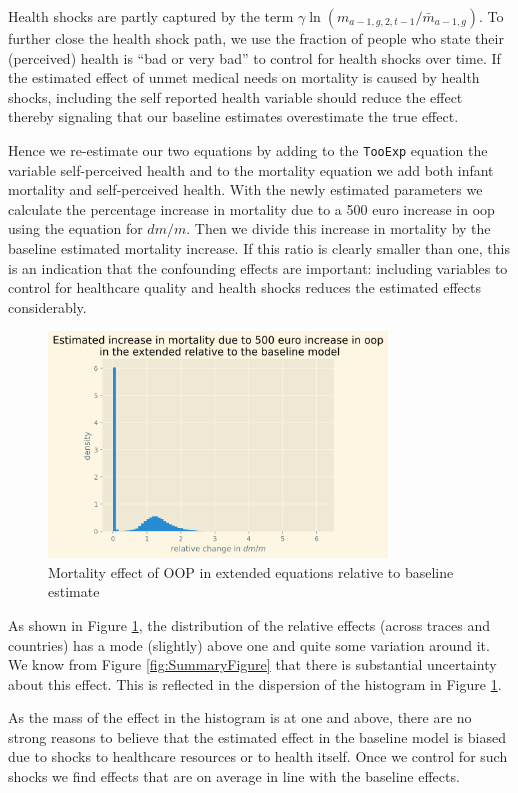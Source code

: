 \documentclass[a4paper,12pt]{article}
\begin{document}
Health shocks are partly captured by the term \(\gamma \ln(m_{a-1,g,2,t-1}/\bar m_{a-1,g})\). To further close the health shock path, we use the fraction of people who state their (perceived) health is ``bad or very bad'' to control for health shocks over time. If the estimated effect of unmet medical needs on mortality is caused by health shocks, including the self reported health variable should reduce the effect thereby signaling that our baseline estimates overestimate the true effect.

Hence we re-estimate our two equations by adding to the \texttt{TooExp} equation the variable self-perceived health and to the mortality equation we add both infant mortality and self-perceived health. With the newly estimated parameters we calculate the percentage increase in mortality due to a 500 euro increase in oop using the equation for \(dm/m\). Then we divide this increase in mortality by the baseline estimated mortality increase. If this ratio is clearly smaller than one, this is an indication that the confounding effects are important: including variables to control for healthcare quality and health shocks reduces the estimated effects considerably.

\begin{figure}[htbp]
\centering
\includegraphics[height=6cm]{./figures/histogram_colliders.png}
\caption{\label{fig:hist_colliders}Mortality effect of OOP in extended equations relative to baseline estimate}
\end{figure}

As shown in Figure \ref{fig:hist_colliders}, the distribution of the relative effects (across traces and countries) has a mode (slightly) above one and quite some variation around it. We know from Figure \ref{fig:SummaryFigure} that there is substantial uncertainty about this effect. This is reflected in the dispersion of the histogram in Figure \ref{fig:hist_colliders}. 

As the mass of the effect in the histogram is at one and above, there are no strong reasons to believe that the estimated effect in the baseline model is biased due to shocks to healthcare resources or to health itself. Once we control for such shocks we find effects that are on average in line with the baseline effects. 
\end{document}
